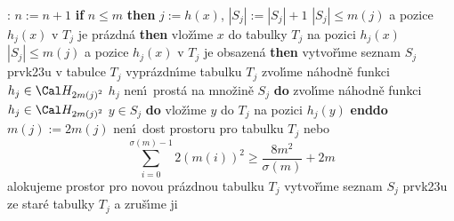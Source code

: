 : \newline 
$n:=n+1$ \newline 
{\bf if} $n\le m$ {\bf then}\newline 
\phantom{---}$j:=h\left(x\right)$, $|S_j|:=|S_j|+1$\newline 
\phantom{---}{\bf if} $|S_j|\le m\left(j\right)$ a pozice $h_j\left(x\right)$ v $T_j$ je pr\'azdn\'a {\bf then}\newline 
\phantom{------}vlo\v z\'\i me $x$ do tabulky $T_j$  na pozici $
h_j\left(x\right)$\newline 
\phantom{---}{\bf else}\newline 
\phantom{------}{\bf if} $|S_j|\le m\left(j\right)$ a pozice $h_j\left(x\right)$ v $T_
j$ je obsazen\'a {\bf then}\newline 
\phantom{---------}vytvo\v r\'\i me seznam $S_j$ prvk\accent23u v tabulce $
T_j$\newline 
\phantom{---------}vypr\'azdn\'\i me tabulku $T_j$\newline 
\phantom{---------}zvol\'\i me n\'ahodn\v e funkci $h_j\in \Cal H_{2m\left(j\right)^2}$\newline 
\phantom{---------}{\bf while} $h_j$ nen\'\i\ prost\'a na mno\v zin\v e $S_j$ {\bf do}\newline
\phantom{------------}zvol\'\i me n\'ahodn\v e funkci $h_j\in \Cal H_{2m\left(j\right)^2}$\newline 
\phantom{---------}{\bf enddo}\newline
\phantom{---------}{\bf for every} $y\in S_j$ {\bf do} vlo\v z\'\i me $
y$ do $T_j$ na pozici $h_j\left(y\right)$ {\bf enddo}\newline 
\phantom{------}{\bf else}\newline 
\phantom{---------}$m\left(j\right):=2m\left(j\right)$\newline 
\phantom{---------}{\bf if} nen\'\i\ dost prostoru pro tabulku $
T_j$ nebo 
$$\sum_{i=0}^{\sigma \left(m\right)-1}2\left(m\left(i\right)\right)^2\ge\frac {8m^2}{\sigma \left(m\right)}+2
m$$
\phantom{---------}{\bf then}\newline 
\phantom{------------}{\bf RehashAll}\newline 
\phantom{---------}{\bf else}\newline 
\phantom{------------}alokujeme prostor pro novou pr\'azdnou tabulku $
T_j$ \newline 
\phantom{------------}vytvo\v r\'\i me seznam $S_j$ prvk\accent23u ze star\'e tabulky $T_j$ a zru\v s\'\i me ji\newline 
